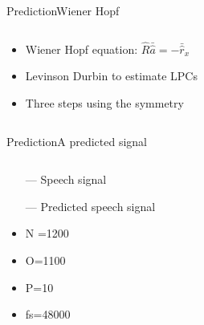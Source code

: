 \begin{frame}{Prediction}{Wiener Hopf}
	\begin{columns}
		\begin{column}{0.4\textwidth}
			\begin{itemize}
				\item Wiener Hopf equation: $\hat{R}  \bar{\hat{a}} = -\bar{\hat{r}}_x$
				\item Levinson Durbin to estimate LPCs 
				\item Three steps using the symmetry
			\end{itemize}
			
		\end{column}
		\begin{column}{0.6\textwidth} 
				\resizebox{1.0\columnwidth}{!}{	
				
			}	
		\end{column}
	\end{columns}
\end{frame}

\begin{frame}{Prediction}{A predicted signal}
	\begin{columns}
		\begin{column}{0.4\textwidth}
			\begin{itemize}
				\item[\textcolor{MATLABblue}{---}] Speech signal
				\item[\textcolor{MATLABorange}{---}] Predicted speech signal
				\item N =1200
				\item O=1100
				\item P=10
				\item fs=48000
			\end{itemize}
			
		\end{column}
		\begin{column}{0.6\textwidth} 
			\resizebox{1.0\columnwidth}{!}{	
				
			}
		\end{column}
	\end{columns}
\end{frame}






















